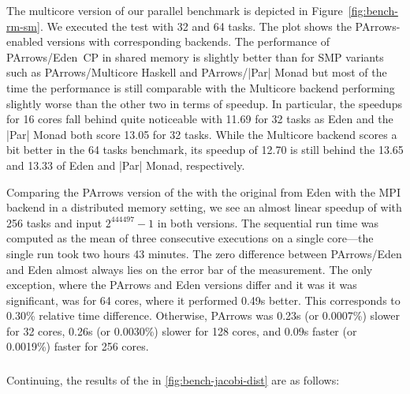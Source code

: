 The multicore version of our parallel \rmtest benchmark is depicted in
Figure~\ref{fig:bench-rm-sm}. We executed the test with 32 and 64
tasks. The plot shows the PArrows-enabled versions with corresponding backends.
The performance of PArrows/Eden~CP in shared memory is slightly better than
for SMP variants such as PArrows/Multicore Haskell and PArrows/|Par|
Monad but most of the time the performance is still comparable with the Multicore backend performing slightly worse than the other two in terms of speedup. In particular, the speedups for 16 cores fall behind quite noticeable with 11.69 for 32 tasks as Eden and the |Par| Monad both score 13.05 for 32 tasks. While the Multicore backend scores a bit better in the 64 tasks benchmark, its speedup of 12.70 is still behind the 13.65 and 13.33 of Eden and |Par| Monad, respectively.

Comparing the PArrows version of the \rmtest with the original from Eden with the MPI backend in a distributed memory setting, we see an almost linear speedup of
\rmtest with 256 tasks and input $2^444497-1$ in both versions. The sequential run time
was computed as the mean of three consecutive executions on a single
core---the single run took two hours 43 minutes. The zero difference  between
PArrows/Eden and Eden almost always lies on the error bar of
the measurement. The only exception, where the PArrows and Eden versions differ and it was it was significant, was for 64 cores, where it performed 0.49s better. This corresponds to
0.30\% relative time difference. Otherwise, PArrows was 0.23s (or 0.0007\%) slower for 32 cores, 0.26s (or 0.0030\%) slower for 128 cores, and 0.09s faster (or 0.0019\%) faster for 256 cores.


\subsubsection{\jacobitest}

Continuing, the results of the \jacobitest in \ref{fig:bench-jacobi-dist} are as follows:

